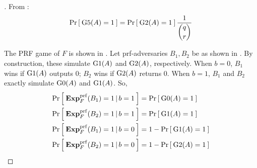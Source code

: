 \begin{proof}[]
From  :
\begin{equation}
\Pr\left[\: \text{G5}(A)=1 \:\right] = \Pr\left[\: \text{G2}(A)=1 \:\right]\frac{1}{\dbinom{q}{r}}\label{eq:3c}
\end{equation}

The PRF game of $F$ is shown in . Let prf-adversaries
$B_1, B_2$ be as shown in .   By
construction, these simulate $\text{G1}(A)$ and $\text{G2}(A)$, respectively. When $b=0$, $B_1$ wins if $\text{G1}(A)$ outputs 0; $B_2$ wins if $\text{G2}(A)$ returns 0. When $b=1$, $B_1$ and $B_2$ exactly simulate $\text{G0}(A)$ and $\text{G1}(A)$. So, 
\begin{align}
\Pr\left[\: \mathbf{Exp}^{\mathrm{prf}}_{F}(B_1) = 1\,|\,b=1 \:\right] &= \Pr\left[\: \text{G0}(A)=1 \:\right]\label{eq:m1}\\
\Pr\left[\: \mathbf{Exp}^{\mathrm{prf}}_{F}(B_2) = 1\,|\,b=1 \:\right] &= \Pr\left[\: \text{G1}(A)=1 \:\right]\label{eq:m2}\\
\Pr\left[\: \mathbf{Exp}^{\mathrm{prf}}_{F}(B_1) = 1\,|\,b=0 \:\right] &= 1-\Pr\left[\: \text{G1}(A)=1 \:\right]\label{eq:m3}\\
\Pr\left[\: \mathbf{Exp}^{\mathrm{prf}}_{F}(B_2) = 1\,|\,b=0 \:\right] &= 1-\Pr\left[\: \text{G2}(A)=1 \:\right]\label{eq:m4}
\end{align}


\end{proof}
